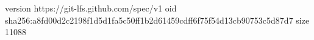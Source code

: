 version https://git-lfs.github.com/spec/v1
oid sha256:a8fd00d2c2198f1d5d1fa5c50ff1b2d61459cdff6f75f54d13cb90753c5d87d7
size 11088

